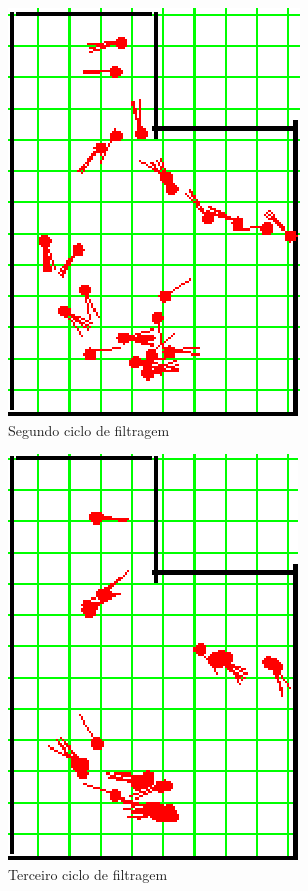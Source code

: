 \begin{figure}[H]
  \centering
  \includegraphics[scale=1]{figuras/cen4_ex1/3.eps}
  \caption[Segundo Ciclo de Filtragem]{Segundo ciclo de filtragem}
  \label{img:cen4_ex1_3}
\end{figure}

\begin{figure}[H]
  \centering
  \includegraphics[scale=1]{figuras/cen4_ex1/4.eps}
  \caption[Terceiro Ciclo de Filtragem]{Terceiro ciclo de filtragem}
  \label{img:cen4_ex1_4}
\end{figure}

